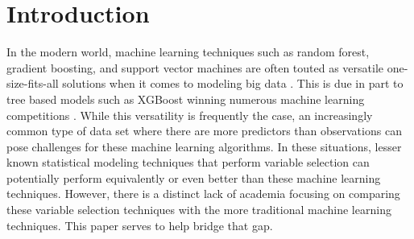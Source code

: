 \documentclass{article}
\begin{document}
\section{Introduction}

In the modern world, machine learning techniques such as random forest, gradient boosting, and support vector machines are often touted as versatile one-size-fits-all solutions when it comes to modeling big data \cite{nielsen2016tree}. This is due in part to tree based models such as XGBoost winning numerous machine learning competitions \cite{nielsen2016tree}. While this versatility is frequently the case, an increasingly common type of data set where there are more predictors than observations can pose challenges for these machine learning algorithms. In these situations, lesser known statistical modeling techniques that perform variable selection can potentially perform equivalently or even better than these machine learning techniques. However, there is a distinct lack of academia focusing on comparing these variable selection techniques with the more traditional machine learning techniques. This paper serves to help bridge that gap.


\end{document}
